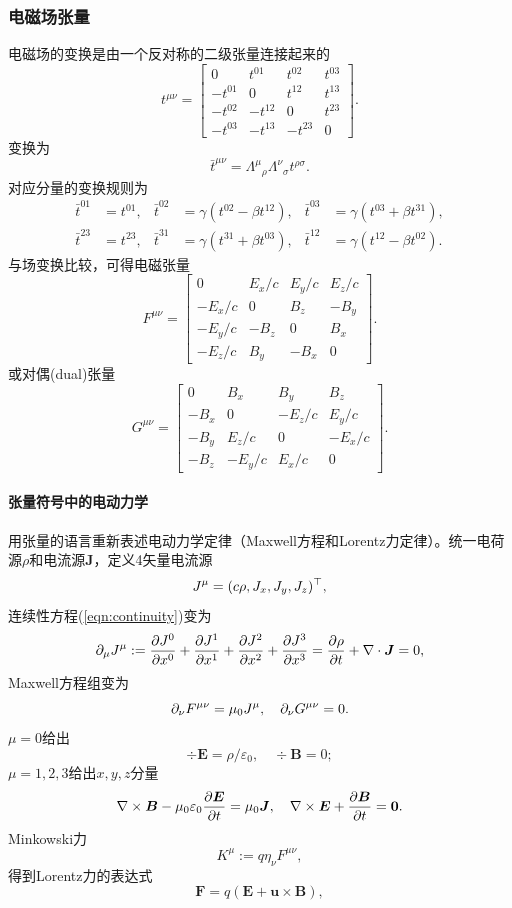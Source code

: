 \subsubsection{电磁场张量}
电磁场的变换是由一个反对称的二级张量连接起来的
\[
    t^{\mu\nu}=
    \begin{bmatrix}
        0&t^{01}&t^{02}&t^{03}\\
        -t^{01}&0&t^{12}&t^{13}\\
        -t^{02}&-t^{12}&0&t^{23}\\
        -t^{03}&-t^{13}&-t^{23}&0
    \end{bmatrix}.
\]
变换为 
\[
    \bar t^{\mu\nu}=\Lambda^\mu{}_\rho\Lambda^\nu{}_\sigma t^{\rho\sigma}.
\]
对应分量的变换规则为
\begin{align*}
    \bar t^{01}&=t^{01},&\bar t^{02}&=\gamma(t^{02}-\beta t^{12}),&\bar t^{03}&=\gamma(t^{03}+\beta t^{31}),\\
    \bar t^{23}&=t^{23},&\bar t^{31}&=\gamma(t^{31}+\beta t^{03}),&\bar t^{12}&=\gamma(t^{12}-\beta t^{02}).
\end{align*}
与场变换比较，可得电磁张量
\begin{equation}
    F^{\mu\nu}=
    \begin{bmatrix}
        0&E_x/c&E_y/c&E_z/c\\
        -E_x/c&0&B_z&-B_y\\
        -E_y/c&-B_z&0&B_x\\
        -E_z/c&B_y&-B_x&0
    \end{bmatrix}.
\end{equation}
或对偶(dual)张量
\begin{equation}
    G^{\mu\nu}=
    \begin{bmatrix}
        0&B_x&B_y&B_z\\
        -B_x&0&-E_z/c&E_y/c\\
        -B_y&E_z/c&0&-E_x/c\\
        -B_z&-E_y/c&E_x/c&0
    \end{bmatrix}.
\end{equation}
\paragraph{张量符号中的电动力学}
用张量的语言重新表述电动力学定律（Maxwell方程和Lorentz力定律）。统一电荷源$\rho$和电流源$\bm J$，定义4矢量电流源
\begin{equation}
    J^\mu=(c\rho,J_x,J_y,J_z)^\top,
\end{equation}
连续性方程(\ref{eqn:continuity})变为 
\[
    \partial_\mu J^\mu:=\frac{\partial J^0}{\partial x^0}+\frac{\partial J^1}{\partial x^1}+\frac{\partial J^2}{\partial x^2}+\frac{\partial J^3}{\partial x^3}=\frac{\partial^{\;\!\!}\rho}{\partial t^{\;\!\!}}+\nabla\cdot\bm J=0,
\]
Maxwell方程组变为 
\begin{equation}
    \partial_\nu F^{\mu\nu}=\mu_0J^\mu,\quad\partial_\nu G^{\mu\nu}=0.
\end{equation}
$\mu=0$给出 
\[
    \div\bm E=\rho/\varepsilon_0,\quad\div\bm B=0;
\]
$\mu=1,2,3$给出$x,y,z$分量 
\[
    \curl\bm B-\mu_0\varepsilon_0\pv{\bm E}t=\mu_0\bm J,\quad\curl\bm E+\pv{\bm B}t=\bm0.
\]
Minkowski力 
\begin{equation}
    K^\mu:=q\eta_\nu F^{\mu\nu},
\end{equation}
得到Lorentz力的表达式
\[
    \bm F=q(\bm E+\bm u\times\bm B),
\]
